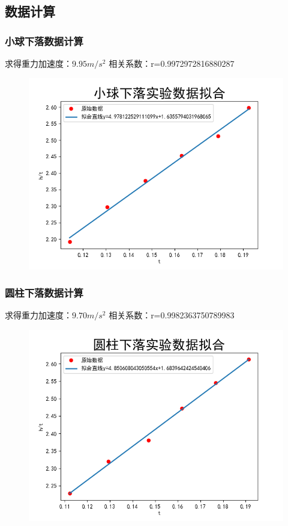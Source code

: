 \documentclass[UTF8]{ctexart}
\begin{document}
\subsection*{数据计算}
\subsubsection{小球下落数据计算}
求得重力加速度：$9.95m/s^2$
\newline 相关系数：r=0.9972972816880287
\begin{figure}[h]
    \includegraphics[scale=0.7]{data1_r=0.9972972816880287.png}
\end{figure}
\subsubsection{圆柱下落数据计算}
求得重力加速度：$9.70m/s^2$
\newline 相关系数：r=0.9982363750789983
\begin{figure}[h]
\includegraphics[scale=0.7]{data2_r=0.9982363750789983.png}
\end{figure}
\end{document}
